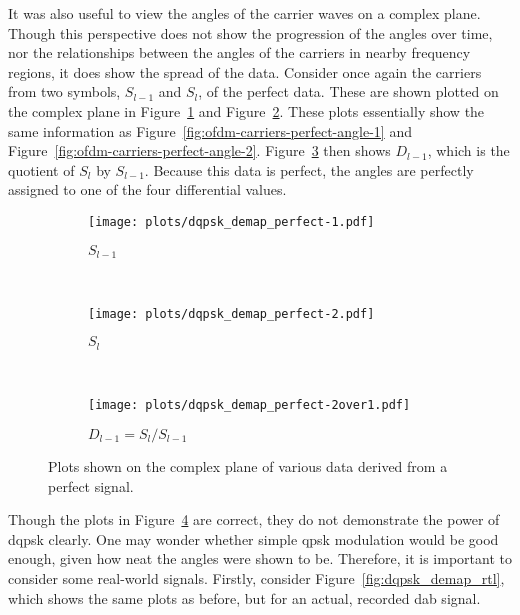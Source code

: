 \documentclass[class=report,11pt,crop=false]{standalone}
\begin{document}
It was also useful to view the angles of the carrier waves on a complex plane. Though this perspective does not show the progression of the angles over time, nor the relationships between the angles of the carriers in nearby frequency regions, it does show the spread of the data. Consider once again the carriers from two symbols, \(S_{l-1}\) and \(S_{l}\), of the perfect data. These are shown plotted on the complex plane in Figure~\ref{fig:dqpsk_demap_perfect-1} and Figure~\ref{fig:dqpsk_demap_perfect-2}. These plots essentially show the same information as Figure~\ref{fig:ofdm-carriers-perfect-angle-1} and Figure~\ref{fig:ofdm-carriers-perfect-angle-2}. Figure~\ref{fig:dqpsk_demap_perfect-2over1} then shows \(D_{l-1}\), which is the quotient of \(S_{l}\) by \(S_{l-1}\). Because this data is perfect, the angles are perfectly assigned to one of the four differential values.

\begin{figure}[htbp]
  \centering
  \captionsetup{type=figure}
  \begin{subfigure}[t]{0.3\textwidth}
    \centering
    \captionsetup{type=figure}
    \texttt{[image: plots/dqpsk\_demap\_perfect-1.pdf]}
    \caption{\(S_{l-1}\)}
    \label{fig:dqpsk_demap_perfect-1}
  \end{subfigure}%
  ~ 
  \begin{subfigure}[t]{0.3\textwidth}
    \centering
    \captionsetup{type=figure}
    \texttt{[image: plots/dqpsk\_demap\_perfect-2.pdf]}
    \caption{\(S_{l}\)}
    \label{fig:dqpsk_demap_perfect-2}
  \end{subfigure}
  ~ 
  \begin{subfigure}[t]{0.3\textwidth}
    \centering
    \captionsetup{type=figure}
    \texttt{[image: plots/dqpsk\_demap\_perfect-2over1.pdf]}
    \caption{\(D_{l-1} = S_{l}/S_{l-1}\)}
    \label{fig:dqpsk_demap_perfect-2over1}
  \end{subfigure}
  \caption{Plots shown on the complex plane of various data derived from a perfect  signal.}
  \label{fig:dqpsk_demap_perfect}
\end{figure}

Though the plots in Figure~\ref{fig:dqpsk_demap_perfect} are correct, they do not demonstrate the power of \gls{dqpsk} clearly. One may wonder whether simple \gls{qpsk} modulation would be good enough, given how neat the angles were shown to be. Therefore, it is important to consider some real-world signals. Firstly, consider Figure~\ref{fig:dqpsk_demap_rtl}, which shows the same plots as before, but for an actual, recorded \gls{dab} signal.
\end{document}
